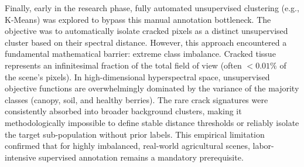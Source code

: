 \medskip\noindent
Finally, early in the research phase, fully automated unsupervised clustering (e.g., K-Means) was explored to bypass this manual annotation bottleneck. The objective was to automatically isolate cracked pixels as a distinct unsupervised cluster based on their spectral distance. However, this approach encountered a fundamental mathematical barrier: extreme class imbalance. Cracked tissue represents an infinitesimal fraction of the total field of view (often $<0.01\%$ of the scene's pixels). In high-dimensional hyperspectral space, unsupervised objective functions are overwhelmingly dominated by the variance of the majority classes (canopy, soil, and healthy berries). The rare crack signatures were consistently absorbed into broader background clusters, making it methodologically impossible to define stable distance thresholds or reliably isolate the target sub-population without prior labels. This empirical limitation confirmed that for highly imbalanced, real-world agricultural scenes, labor-intensive supervised annotation remains a mandatory prerequisite.
